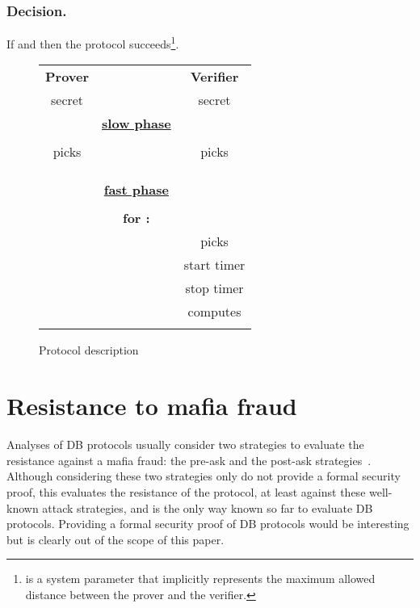 \documentclass{llncs}
\begin{document}
\subsubsection{Decision.} If  and    then the protocol succeeds\footnote{ 
is a system parameter that implicitly 
represents the maximum allowed distance between the prover and the verifier.}.
\begin{figure*}
\centering
 {\renewcommand\normalsize{\footnotesize}\normalsize

\begin{tabular}{|ccc|}
\hline
\normalsize{\textbf{Prover}}&&\normalsize{\textbf{Verifier}}\\
secret &&secret \\
&\textbf{\underline{slow phase}}&\\
&&\\
picks  &&picks \\
&&\\
&&\\


&&\\
&\textbf{\underline{fast phase}}&\\
&&\\
&\textbf{for :}&\\
&&picks \\
&& start timer\\
&&stop 
timer\\
 && computes \\
 &&\\\hline
 \end{tabular}}

\caption{Protocol description\label{fig:2b}}
\end{figure*}

\section{Resistance to mafia fraud}\label{sec:mafia}

Analyses of DB protocols usually consider two strategies to evaluate the resistance against a mafia fraud: the pre-ask and the post-ask strategies~\cite{AvoineBKLM-2011-jcs}. Although considering these two strategies only do not provide a formal security proof, this evaluates the resistance of the protocol, at least against these well-known attack strategies, and is the only way known so far to evaluate DB protocols. Providing a formal security proof of DB protocols would be interesting but is clearly out of the scope of this paper.
\end{document}
